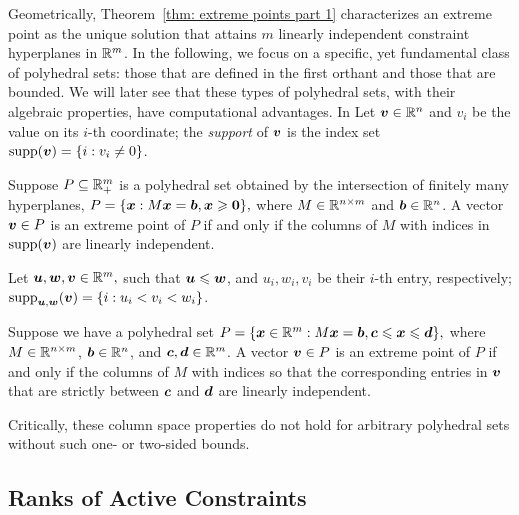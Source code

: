 Geometrically, Theorem~\ref{thm: extreme points part 1} characterizes an extreme point as the unique solution that attains $m$ linearly independent constraint hyperplanes in $\mathbb R^m$. In the following, we focus on a specific, yet fundamental class of polyhedral sets: those that are defined in the first orthant and those that are bounded. We will later see that these types of polyhedral sets, with their algebraic properties, have computational advantages. In Let ${\boldsymbol v}\in \mathbb R^n$ and $v_i$ be the value on its $i$-th coordinate; the {\em support} of ${\boldsymbol v}$ is the index set $\operatorname{supp}({\boldsymbol v}) = \{i: v_i \neq 0\}$.

\begin{theorem}\label{thm: extreme points part 2}
Suppose $P\subseteq \mathbb R^m_+$ is a polyhedral set obtained by the intersection of finitely many hyperplanes, $P =\{ {\boldsymbol x}:  M\boldsymbol x = {\boldsymbol b}, {\boldsymbol x}\geqslant\boldsymbol0\},$ where $M\in\mathbb R^{n\times m}$ and ${\boldsymbol b}\in\mathbb R^n$.  A vector ${\boldsymbol v}\in P$ is an extreme point of $P$ if and only if the columns of $M$ with indices in $\operatorname{supp}({\boldsymbol v})$ are linearly independent.
\end{theorem}

Let ${\boldsymbol u}, {\boldsymbol w}, {\boldsymbol v}\in\mathbb R^m,$ such that ${\boldsymbol u} \leqslant {\boldsymbol w}$, and $u_i, w_i, v_i$ be their $i$-th entry, respectively;  $\operatorname{supp}_{{\boldsymbol u}, {\boldsymbol w}}({\boldsymbol v}) = \{i: u_i < v_i < w_i\}$. 

\begin{theorem}\label{thm: extreme points part 3}
Suppose we have a polyhedral set $P =\{ {\boldsymbol x} \in \mathbb R^m:  M\boldsymbol x = {\boldsymbol b}, {\boldsymbol c} \leqslant {\boldsymbol x} \leqslant {\boldsymbol d}\},$ where $M\in\mathbb R^{n\times m}$, ${\boldsymbol b}\in\mathbb R^n$, and ${\boldsymbol c}, {\boldsymbol d}\in\mathbb R^m$. A vector ${\boldsymbol v}\in P$ is an extreme point of $P$ if and only if the columns of $M$ with indices so that the corresponding entries in ${\boldsymbol v}$ that are strictly between ${\boldsymbol c}$ and ${\boldsymbol d}$ are linearly independent.
\end{theorem}

Critically, these column space properties do not hold for arbitrary polyhedral sets without such one- or two-sided bounds. 

\subsection{Ranks of Active Constraints}

